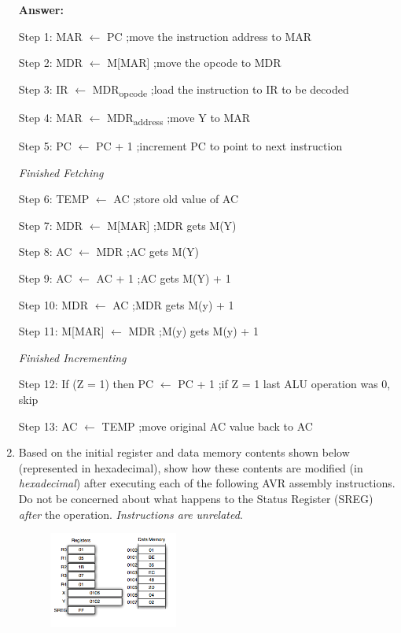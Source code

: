 \documentclass[12pt,letterpaper]{article}
\begin{document}
\begin{enumerate}
	\textbf{Answer:}
	
	Step 1: MAR $\leftarrow$ PC							\hfill ;move the instruction address to MAR
	
	Step 2: MDR $\leftarrow$ M[MAR]					\hfill ;move the opcode to MDR
	
	Step 3: IR $\leftarrow$ MDR\textsubscript{opcode}	\hfill ;load the instruction to IR to be decoded
	
	Step 4: MAR $\leftarrow$ MDR\textsubscript{address}  \hfill ;move Y to MAR
	
	Step 5: PC $\leftarrow$ PC + 1							\hfill ;increment PC to point to next instruction
	
	\centering \textit{Finished Fetching}
	
	Step 6: TEMP $\leftarrow$ AC 					\hfill ;store old value of AC
	
	Step 7: MDR $\leftarrow$ M[MAR]				\hfill ;MDR gets M(Y)
	
	Step 8: AC $\leftarrow$ MDR				  \hfill ;AC gets M(Y)
	
	Step 9: AC $\leftarrow$ AC + 1 					\hfill ;AC gets M(Y) + 1
	
	Step 10: MDR $\leftarrow$ AC 				\hfill ;MDR gets M(y) + 1
		
	Step 11: M[MAR] $\leftarrow$ MDR 				\hfill ;M(y) gets M(y) + 1
	
	\centering \textit{Finished Incrementing}
	
	Step 12: If (Z = 1) then PC $\leftarrow$ PC + 1 \hfill ;if Z = 1 last ALU operation was 0, skip
	
	Step 13: AC  $\leftarrow$ TEMP				\hfill ;move original AC value back to AC
	
	
	\item
	Based on the initial register and data memory contents shown below (represented in hexadecimal), show how
	these contents are modified (in \textit{hexadecimal}) after executing each of the following AVR assembly instructions.
	Do not be concerned about what happens to the Status Register (SREG) \textit{after} the operation. 
	\textit{Instructions are unrelated}.

	\begin{figure}[h] %
		\flushright
		\includegraphics[width=0.4\textwidth]{Q4.png}
	\end{figure}
	

\end{enumerate}
\end{document}
